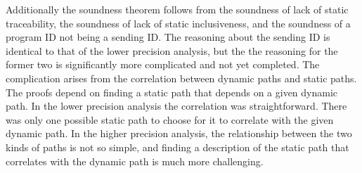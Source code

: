 \documentclass{article}
\begin{document}
Additionally the soundness theorem follows from the soundness of lack of static traceability,
the soundness of lack of static inclusiveness,
and the soundness of a program ID not being a sending ID. 
The reasoning about the sending ID is identical to that of the lower precision analysis, but
the the reasoning for the former two is significantly more complicated and not yet completed.
The complication arises from the
correlation between dynamic paths and static paths.  The proofs depend on finding a static 
path that depends on a given dynamic path. In the lower precision analysis the
correlation was straightforward. There was only one possible static path to choose for it
to correlate with the given dynamic path. In the higher precision analysis, the relationship
between the two kinds of paths is not so simple, and finding a description of the static path
that correlates with the dynamic path is much more challenging.
\end{document}
